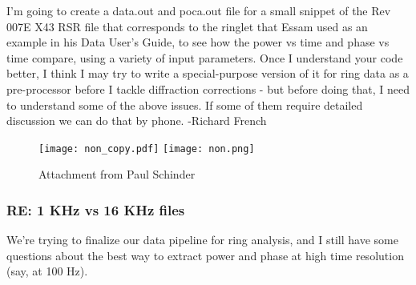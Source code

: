 \documentclass[crop=false,class=book]{standalone}
\begin{document}
I'm going to create a data.out and poca.out file for a small snippet of the Rev 007E X43 RSR file that corresponds to the ringlet that Essam used as an example in his Data User's Guide, to see how the power vs time and phase vs time compare, using a variety of input parameters. Once I understand your code better, I think I may try to write a special-purpose version of it for ring data as a pre-processor before I tackle diffraction corrections - but before doing that, I need to understand  some of the above issues. If some of them require detailed discussion we can do that by phone. -Richard French
\begin{figure}[H]
    \centering
    \texttt{[image: non\_copy.pdf]}
    \hfill
    \texttt{[image: non.png]}
    \caption{Attachment from Paul Schinder}
\end{figure}
\subsubsection{\footnotesize RE: 1 KHz vs 16 KHz files}
We're trying to finalize our data pipeline for ring analysis, and I still have some questions about the best way to extract power and phase at high time resolution (say, at 100 Hz). 
\end{document}

